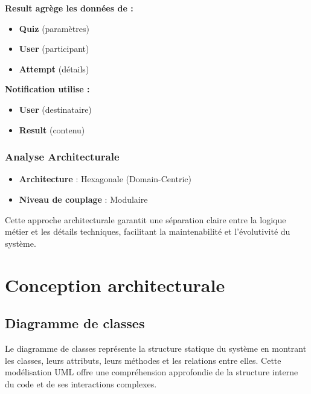 \documentclass[12pt,a4paper]{report}
\begin{document}
\textbf{Result agrège les données de :}
\begin{itemize}
    \item \textbf{Quiz} (paramètres)
    \item \textbf{User} (participant)
    \item \textbf{Attempt} (détails)
\end{itemize}

\textbf{Notification utilise :}
\begin{itemize}
    \item \textbf{User} (destinataire)
    \item \textbf{Result} (contenu)
\end{itemize}

\subsubsection{Analyse Architecturale}

\begin{itemize}
    \item \textbf{Architecture} : Hexagonale (Domain-Centric)
    \item \textbf{Niveau de couplage} : Modulaire
\end{itemize}

Cette approche architecturale garantit une séparation claire entre la logique métier et les détails techniques, facilitant la maintenabilité et l'évolutivité du système.

\section{Conception architecturale}

\subsection{Diagramme de classes}

Le diagramme de classes représente la structure statique du système en montrant les classes, leurs attributs, leurs méthodes et les relations entre elles. Cette modélisation UML offre une compréhension approfondie de la structure interne du code et de ses interactions complexes.
\end{document}
